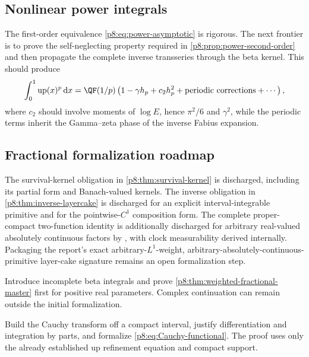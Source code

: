 \documentclass[11pt,oneside]{article}
\theoremstyle{definition}
\theoremstyle{remark}
\newcommand{\Up}{\operatorname{up}}
\newcommand{\dd}{\,\mathrm d}
\newcommand{\1}{\mathbf 1}
\begin{document}
\subsection{Nonlinear power integrals}

The first-order equivalence \eqref{p8:eq:power-asymptotic} is rigorous.  The next
frontier is to prove the self-neglecting property required in
\cref{p8:prop:power-second-order} and then propagate the complete inverse
transseries through the beta kernel.  This should produce
\begin{equation}
 \int_0^1\Up(x)^p\dd x
 =\QF(1/p)\left(1-\gamma h_p+c_2h_p^2+\text{periodic corrections}+\cdots\right),
 \label{p8:eq:power-full-frontier}
\end{equation}
where \(c_2\) should involve moments of \(\log E\), hence \(\pi^2/6\) and
\(\gamma^2\), while the periodic terms inherit the Gamma--zeta phase of the
inverse Fabius expansion.

\subsection{Fractional formalization roadmap}

\begin{statusbox}
The survival-kernel obligation in \cref{p8:thm:survival-kernel} is discharged, including
its partial form and Banach-valued kernels.  The inverse obligation in
\cref{p8:thm:inverse-layercake} is discharged for an explicit interval-integrable
primitive and for the pointwise-\(C^1\) composition form.  The complete proper-compact
two-function identity is additionally discharged for arbitrary real-valued absolutely
continuous factors by , with clock measurability derived
internally.  Packaging the report's exact arbitrary-\(L^1\)-weight,
arbitrary-absolutely-continuous-primitive layer-cake signature remains an open
formalization step.
\end{statusbox}

\begin{obligation}
Introduce incomplete beta integrals and prove
\cref{p8:thm:weighted-fractional-master} first for positive real parameters.
Complex continuation can remain outside the initial formalization.
\end{obligation}

\begin{obligation}
Build the Cauchy transform off a compact interval, justify differentiation and
integration by parts, and formalize \eqref{p8:eq:Cauchy-functional}.  The proof
uses only the already established up refinement equation and compact support.
\end{obligation}
\end{document}
